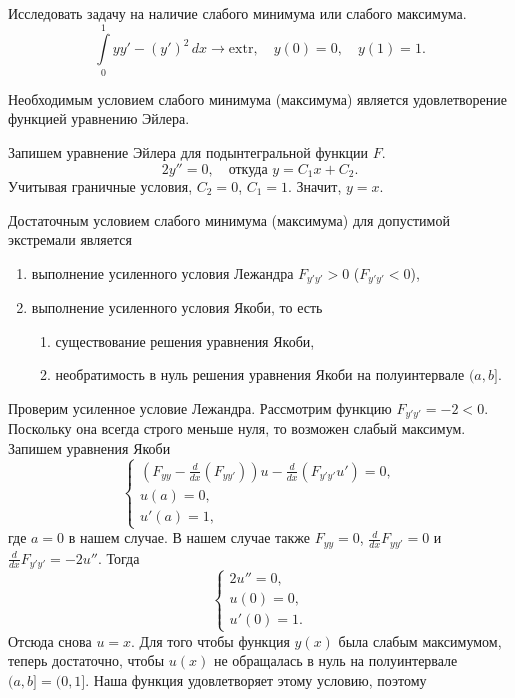 \begin{problem}
  Исследовать задачу на наличие слабого минимума или слабого максимума. 
  \[
    \int\limits_{0}^{1} yy' - (y')^2\,dx \to \mathrm{extr}, \quad y(0) = 0,
    \quad y(1) = 1.
  \]
\begin{solution}
Необходимым условием слабого минимума (максимума) является удовлетворение
функцией
уравнению Эйлера.


  Запишем уравнение Эйлера для подынтегральной функции $ F $.  
  \[
    2y'' = 0, \quad \text{откуда } y = C_1 x + C_2.
  \]
 Учитывая граничные условия, $ C_2 = 0 $, $ C_1 = 1 $. Значит, $ y = x $. 

Достаточным условием слабого минимума (максимума) для допустимой экстремали является 
\begin{enumerate}
  \item выполнение усиленного условия Лежандра $ F_{y'y'} > 0 $ ($ F_{y'y'} < 0
    $),
  \item выполнение усиленного условия Якоби, то есть
    \begin{enumerate}
      \item существование решения уравнения Якоби,
      \item необратимость в нуль решения уравнения Якоби на полуинтервале $ (a,
        b]$.
    \end{enumerate}
\end{enumerate}


 Проверим усиленное условие Лежандра. Рассмотрим функцию $ F_{y'y'} = -2 < 0 $. Поскольку она всегда строго
 меньше нуля, то возможен слабый максимум. Запишем уравнения Якоби 
 \[
   \begin{cases}
     \left( F_{yy} - \frac{d}{dx} \left( F_{yy'} \right)  \right) u - \frac{d}{dx}
     \left( F_{y'y'} u' \right) = 0,\\
     u(a) = 0,\\
     u'(a) = 1,
   \end{cases}
 \]
 где $ a = 0 $ в нашем случае. В нашем случае также $ F_{yy} = 0 $, $
 \frac{d}{dx} F_{yy'} = 0 $ и $ \frac{d}{dx}F_{y'y'} = -2u'' $. Тогда  
 \[
     \begin{cases}
       2u'' =0, \\
       u(0) = 0,\\
       u'(0) = 1.
     \end{cases}
 \]
Отсюда снова $ u = x $. Для того чтобы функция $ y(x) $ была слабым максимумом,
теперь достаточно, чтобы $ u(x) $ не обращалась в нуль на полуинтервале $ (a, b] =
(0, 1] $. Наша функция удовлетворяет этому условию, поэтому  

\end{solution}
\end{problem}




